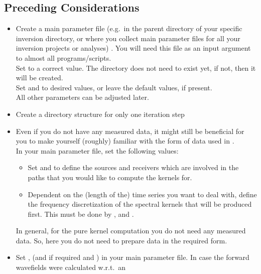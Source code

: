 \subsection*{Preceding Considerations}
%
\begin{itemize}
\item Create a main parameter file (e.g.\ in the parent directory of your specific inversion directory, 
or where you collect main parameter files for all your inversion projects or analyses)
. You will need this file as an input argument to almost all programs/scripts.\\
Set  to a correct value.
The directory does not need to exist yet, if not, then it will be created. \\
Set  and 
 to desired values, 
or leave the default values, if present.\\
All other parameters can be adjusted later. 
%
\item Create a directory structure for only one iteration step 
%
\item Even if you do not have any measured data, it might still be beneficial for you to make yourself 
(roughly) familiar with the form of data used in \ASKI {}. \\
In your main parameter file, set the following values: 
  \begin{itemize}
  \item Set  and  to define the sources and receivers which are
    involved in the paths that you would like to compute the kernels for. 
  \item Dependent on the (length of the) time series you want to deal with, define the frequency discretization of the
    spectral kernels that will be produced first. This must be done by , 
     and .
  \end{itemize}
In general, for the pure kernel computation you do not need any measured data. So, here you do not need to prepare
data in the \ASKI required form.
%
\item Set ,  (and if required  and 
  ) in your main parameter file. In case the forward wavefields were calculated w.r.t.\ an

\end{itemize}
